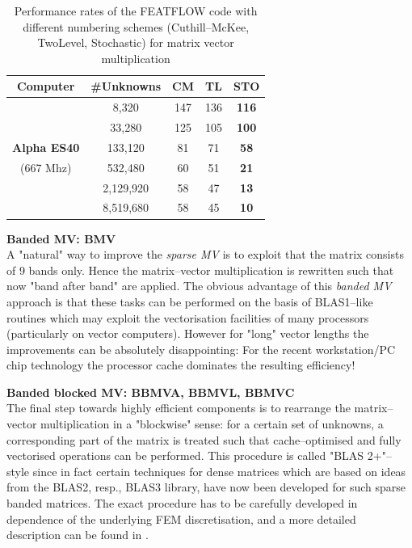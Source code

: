 \begin{table}[!h]
\begin{center}
\begin{tabular}{|c|c||c|c||c|} \hline
Computer     & \#Unknowns  & {\bf CM}&{\bf TL}&{\bf STO}\\ \hline
%
                                           &     8,320 & 147 & 136 & {\bf 116} \\
                                           &    33,280 & 125 & 105 & {\bf 100} \\
{\bf Alpha ES40}                           &   133,120 & 81  & 71 & {\bf 58} \\
(667 Mhz)                                  &   532,480 & 60  & 51 & {\bf  21} \\
                                           & 2,129,920 & 58  & 47 & {\bf  13} \\
                                           & 8,519,680 & 58  & 45 & {\bf  10} \\ \hline
\end{tabular}
\end{center}
\caption{Performance rates of the FEATFLOW code with
different numbering schemes (Cuthill--McKee, TwoLevel, Stochastic)
for matrix vector multiplication}
\label{sparsematvecmulresult}
\end{table}


{\bf Banded MV: BMV}\\
A "natural" way to improve the {\em sparse MV} is to exploit that the matrix consists of 9 bands only. 
Hence the matrix--vector multiplication is rewritten such that now 
"band after band" are applied.  The obvious advantage of this {\em banded MV} approach is that these tasks can be performed on the basis of BLAS1--like routines which may exploit the vectorisation facilities 
of many processors (particularly on vector computers). However for "long" vector lengths the 
improvements can be absolutely disappointing: For the recent workstation/PC chip technology the processor cache dominates the resulting efficiency!


{\bf Banded blocked MV: BBMVA, BBMVL, BBMVC}\\
The final step towards highly efficient components is to rearrange the matrix--vector multiplication 
in a "blockwise" sense: for a certain set of unknowns, a corresponding part of the matrix is treated 
such that cache--optimised and fully vectorised operations can be performed. This procedure is called 
"BLAS 2+"--style since in fact certain techniques for dense matrices which are based on ideas 
from the BLAS2, resp., BLAS3 library, have now been developed for such sparse banded matrices. 
The exact procedure has to be carefully developed in dependence of the underlying FEM discretisation, 
and a more detailed description can be found in \cite{Becker2003}. 

